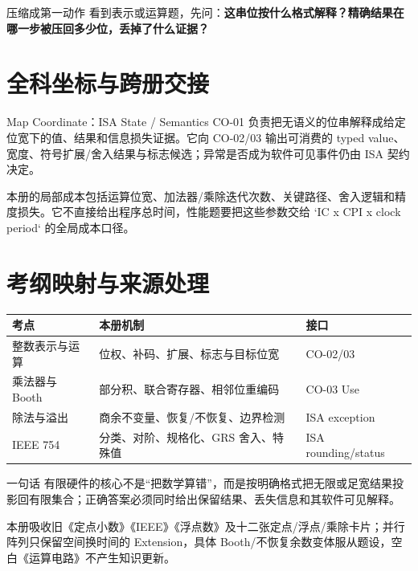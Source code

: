 \documentclass[UTF8,fontset=fandol,11pt,a4paper]{ctexart}
\newcommand{\kw}[1]{\textbf{\color{deep}#1}}
\begin{document}
\begin{methodbox}{压缩成第一动作}
看到表示或运算题，先问：\kw{这串位按什么格式解释？精确结果在哪一步被压回多少位，丢掉了什么证据？}
\end{methodbox}

\section{全科坐标与跨册交接}
\begin{corebox}{Map Coordinate：ISA State / Semantics}
CO-01 负责把无语义的位串解释成给定位宽下的值、结果和信息损失证据。它向 CO-02/03 输出可消费的 typed value、宽度、符号扩展/舍入结果与标志候选；异常是否成为软件可见事件仍由 ISA 契约决定。
\end{corebox}
本册的局部成本包括运算位宽、加法器/乘除迭代次数、关键路径、舍入逻辑和精度损失。它不直接给出程序总时间，性能题要把这些参数交给 `IC x CPI x clock period` 的全局成本口径。

\section{考纲映射与来源处理}
\begin{center}\small
\begin{tabularx}{\linewidth}{L{3.0cm}YY}\toprule
考点 & 本册机制 & 接口\\\midrule
整数表示与运算 & 位权、补码、扩展、标志与目标位宽 & CO-02/03\\
乘法器与 Booth & 部分积、联合寄存器、相邻位重编码 & CO-03 Use\\
除法与溢出 & 商余不变量、恢复/不恢复、边界检测 & ISA exception\\
IEEE 754 & 分类、对阶、规格化、GRS 舍入、特殊值 & ISA rounding/status\\
\bottomrule
\end{tabularx}
\end{center}

\begin{corebox}{一句话}
有限硬件的核心不是“把数学算错”，而是按明确格式把无限或足宽结果投影回有限集合；正确答案必须同时给出保留结果、丢失信息和其软件可见解释。
\end{corebox}

本册吸收旧《定点小数》《IEEE》《浮点数》及十二张定点/浮点/乘除卡片；并行阵列只保留空间换时间的 Extension，具体 Booth/不恢复余数变体服从题设，空白《运算电路》不产生知识更新。
\end{document}
